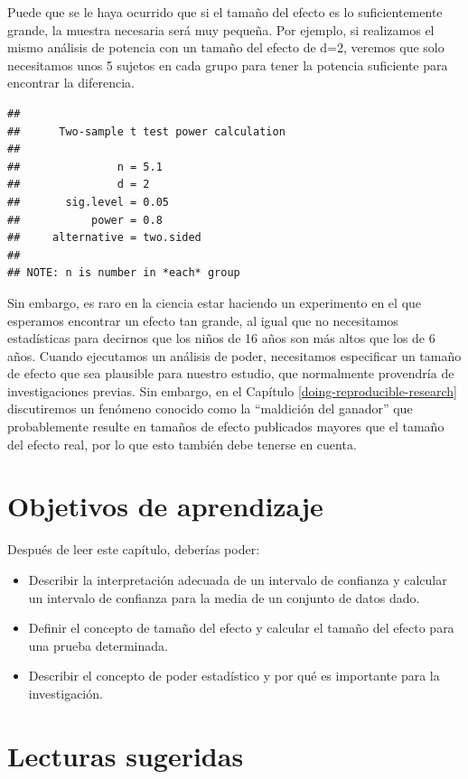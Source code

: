 \documentclass[
  12pt,
]{book}
\providecommand{\tightlist}{%
  \setlength{\itemsep}{0pt}\setlength{\parskip}{0pt}}
\begin{document}
Puede que se le haya ocurrido que si el tamaño del efecto es lo suficientemente grande, la muestra necesaria será muy pequeña. Por ejemplo, si realizamos el mismo análisis de potencia con un tamaño del efecto de d=2, veremos que solo necesitamos unos 5 sujetos en cada grupo para tener la potencia suficiente para encontrar la diferencia.

\begin{verbatim}
## 
##      Two-sample t test power calculation 
## 
##               n = 5.1
##               d = 2
##       sig.level = 0.05
##           power = 0.8
##     alternative = two.sided
## 
## NOTE: n is number in *each* group
\end{verbatim}

Sin embargo, es raro en la ciencia estar haciendo un experimento en el que esperamos encontrar un efecto tan grande, al igual que no necesitamos estadísticas para decirnos que los niños de 16 años son más altos que los de 6 años. Cuando ejecutamos un análisis de poder, necesitamos especificar un tamaño de efecto que sea plausible para nuestro estudio, que normalmente provendría de investigaciones previas. Sin embargo, en el Capítulo \ref{doing-reproducible-research} discutiremos un fenómeno conocido como la ``maldición del ganador'' que probablemente resulte en tamaños de efecto publicados mayores que el tamaño del efecto real, por lo que esto también debe tenerse en cuenta.

\hypertarget{objetivos-de-aprendizaje}{%
\section{Objetivos de aprendizaje}\label{objetivos-de-aprendizaje}}

Después de leer este capítulo, deberías poder:

\begin{itemize}
\tightlist
\item
  Describir la interpretación adecuada de un intervalo de confianza y calcular un intervalo de confianza para la media de un conjunto de datos dado.
\item
  Definir el concepto de tamaño del efecto y calcular el tamaño del efecto para una prueba determinada.
\item
  Describir el concepto de poder estadístico y por qué es importante para la investigación.
\end{itemize}

\hypertarget{lecturas-sugeridas}{%
\section{Lecturas sugeridas}\label{lecturas-sugeridas}}
\end{document}
